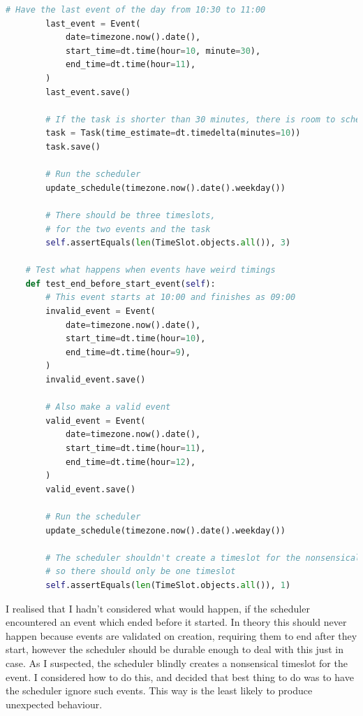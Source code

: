 \documentclass{article}
\begin{document}
\begin{lstlisting}[language=Python]
        # Have the last event of the day from 10:30 to 11:00
        last_event = Event(
            date=timezone.now().date(),
            start_time=dt.time(hour=10, minute=30),
            end_time=dt.time(hour=11),
        )
        last_event.save()

        # If the task is shorter than 30 minutes, there is room to schedule it
        task = Task(time_estimate=dt.timedelta(minutes=10))
        task.save()

        # Run the scheduler
        update_schedule(timezone.now().date().weekday())

        # There should be three timeslots,
        # for the two events and the task
        self.assertEquals(len(TimeSlot.objects.all()), 3)

    # Test what happens when events have weird timings
    def test_end_before_start_event(self):
        # This event starts at 10:00 and finishes as 09:00
        invalid_event = Event(
            date=timezone.now().date(),
            start_time=dt.time(hour=10),
            end_time=dt.time(hour=9),
        )
        invalid_event.save()

        # Also make a valid event
        valid_event = Event(
            date=timezone.now().date(),
            start_time=dt.time(hour=11),
            end_time=dt.time(hour=12),
        )
        valid_event.save()

        # Run the scheduler
        update_schedule(timezone.now().date().weekday())

        # The scheduler shouldn't create a timeslot for the nonsensical event,
        # so there should only be one timeslot
        self.assertEquals(len(TimeSlot.objects.all()), 1)
\end{lstlisting}

I realised that I hadn't considered what would happen,
if the scheduler encountered an event which ended before it started.
In theory this should never happen because events are validated on creation,
requiring them to end after they start,
however the scheduler should be durable enough to deal with this just in case.
As I suspected,
the scheduler blindly creates a nonsensical timeslot for the event.
I considered how to do this,
and decided that best thing to do was to have the scheduler ignore such events.
This way is the least likely to produce unexpected behaviour.
\end{document}
